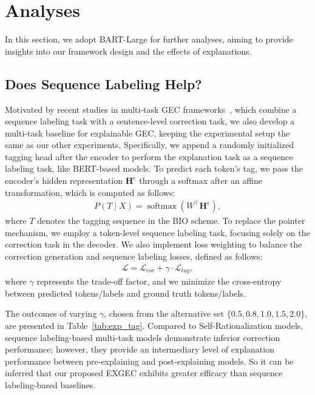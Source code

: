 \section{Analyses}
\label{sec:analyses}
In this section, we adopt BART-Large for further analyses, aiming to provide insights into our framework design and the effects of explanations.

\subsection{Does Sequence Labeling Help?}
\label{subsec:exp_tag}
Motivated by recent studies in multi-task GEC frameworks~\citep{zhao-etal-2019-improving,yuan-etal-2021-multi}, which combine a sequence labeling task with a sentence-level correction task, we also develop a multi-task baseline for explainable GEC, keeping the experimental setup the same as our other experiments. Specifically, we append a randomly initialized tagging head after the encoder to perform the explanation task as a sequence labeling task, like BERT-based models. To predict each token's tag, we pass the encoder's hidden representation $\mathbf{H}^e$ through a softmax after an affine transformation, which is computed as follows:
\begin{equation}\begin{aligned}
P(T \mid X) = \operatorname{softmax}(W^{\top} \mathbf{H}^e),
\end{aligned}\end{equation}
\noindent where $T$ denotes the tagging sequence in the BIO scheme. To replace the pointer mechanism, we employ a token-level sequence labeling task, focusing solely on the correction task in the decoder. We also implement loss weighting to balance the correction generation and sequence labeling losses, defined as follows:
\begin{equation}\begin{aligned}
\mathcal{L} = \mathcal{L}_{cor} + \gamma \cdot \mathcal{L}_{tag},
\end{aligned}\end{equation}
\noindent where $\gamma$ represents the trade-off factor, and we minimize the cross-entropy between predicted tokens/labels and ground truth tokens/labels.

The outcomes of varying $\gamma$, chosen from the alternative set $\{0.5,0.8,1.0,1.5,2.0\}$, are presented in Table~\ref{tab:exp_tag}. Compared to Self-Rationalization models, sequence labeling-based multi-task models demonstrate inferior correction performance; however, they provide an intermediary level of explanation performance between pre-explaining and post-explaining models. So it can be inferred that our proposed EXGEC exhibits greater efficacy than sequence labeling-based baselines.


